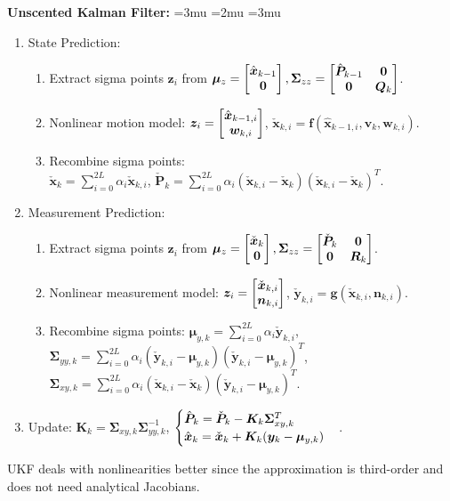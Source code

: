 \documentclass[twocolumn, 8pt]{extarticle}
\newenvironment{tight}
  {\begingroup
   \setlength{\arraycolsep}{2pt}
   \thinmuskip=3mu       %
   \medmuskip=2mu        %
   \thickmuskip=3mu      %
  }
  {
    \endgroup
  }
\begin{document}
\textbf{Unscented Kalman Filter:}
\begin{tight}
  \begin{enumerate}
    \item State Prediction:
    \begin{enumerate}
      \item Extract sigma points $\bm z_i$ from $\bm\mu _z = \cvec{\hat{\bm x}_{k - 1}}{\bm 0}, \bm\Sigma _{zz} = \mattwo{\hat{\bm P}_{k - 1}}{\bm 0}{\bm 0}{\bm Q_k}$.
      \item Nonlinear motion model: $\bm z_i = \cvec{\hat{\bm x}_{k - 1, i}}{\bm w_{k, i}}$, $\check{\bm x}_{k,i} = \bm f(\hat{\bm x}_{k-1, i}, \bm v_k, \bm w_{k,i})$.
      \item Recombine sigma points: \\
            \(\check{\bm x}_k = \sum _{i = 0}^{2L} \alpha _i\check{\bm x}_{k,i}\),
            \(\check{\bm P}_k = \sum _{i = 0}^{2L} \alpha _i(\check{\bm x}_{k,i} - \check{\bm x}_k)(\check{\bm x}_{k,i} - \check{\bm x}_k)^T\).
    \end{enumerate}
    \item Measurement Prediction:
    \begin{enumerate}
      \item Extract sigma points $\bm z_i$ from $\bm\mu _z = \cvec{\check{\bm x}_k}{\bm 0}, \bm\Sigma _{zz} = \mattwo{\check{\bm P}_k}{\bm 0}{\bm 0}{\bm R_k}$.
      \item Nonlinear measurement model: $\bm z_i = \cvec{\check{\bm x}_{k,i}}{\bm n_{k,i}}$, $\check{\bm y}_{k,i} = \bm g(\check{\bm x}_{k,i}, \bm n_{k, i})$.
      \item Recombine sigma points: $\bm\mu _{y, k} = \sum _{i = 0}^{2L} \alpha _i\check{\bm y}_{k, i}$, \\
            $\bm\Sigma _{yy,k} = \sum _{i = 0}^{2L} \alpha _i(\check{\bm y}_{k, i} - \bm\mu _{y, k})(\check{\bm y}_{k, i} - \bm\mu _{y, k})^T$, \\
            $\bm\Sigma _{xy,k} = \sum _{i = 0}^{2L} \alpha _i(\check{\bm x}_{k, i} - \check{\bm x}_k)(\check{\bm y}_{k, i} - \bm\mu _{y, k})^T$.
    \end{enumerate}
    \item Update: $\bm K_k = \bm\Sigma _{xy,k}\bm\Sigma _{yy,k}^{-1}$, $\begin{cases} {\hat{\bm P}_k = \check{\bm P}_k - \bm K_k\bm\Sigma _{xy,k}^T} \\ {\hat{\bm x}_k = \check{\bm x}_k + \bm K_k(\bm y_k - \bm\mu _{y,k})} \end{cases}$.
  \end{enumerate}
\end{tight}
UKF deals with nonlinearities better since the approximation is third-order and does not need analytical Jacobians.
\end{document}
